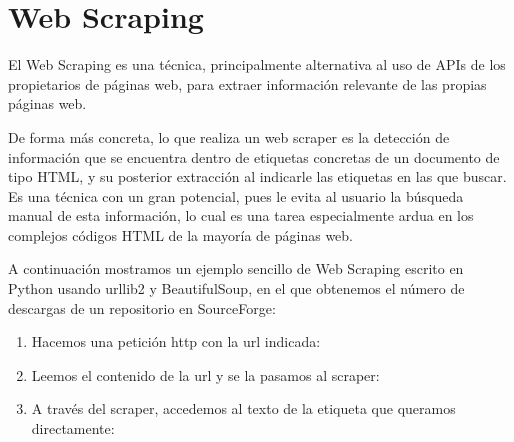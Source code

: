 \section{Web Scraping}

El Web Scraping \cite{mitchell2015web} es una técnica, principalmente alternativa al uso de APIs de los propietarios de páginas web, para extraer información relevante de las propias páginas web.

De forma más concreta, lo que realiza un web scraper es la detección de información que se encuentra dentro de etiquetas concretas de un documento de tipo HTML, y su posterior extracción al indicarle las etiquetas en las que buscar. Es una técnica con un gran potencial, pues le evita al usuario la búsqueda manual de esta información, lo cual es una tarea especialmente ardua en los complejos códigos HTML de la mayoría de páginas web. 

A continuación mostramos un ejemplo sencillo de Web Scraping escrito en Python usando urllib2 y BeautifulSoup, en el que obtenemos el número de descargas de un repositorio en SourceForge:

\begin{enumerate}

\item Hacemos una petición http con la url indicada:


\item Leemos el contenido de la url y se la pasamos al scraper:


\item A través del scraper, accedemos al texto de la etiqueta que queramos directamente:


\end{enumerate}



